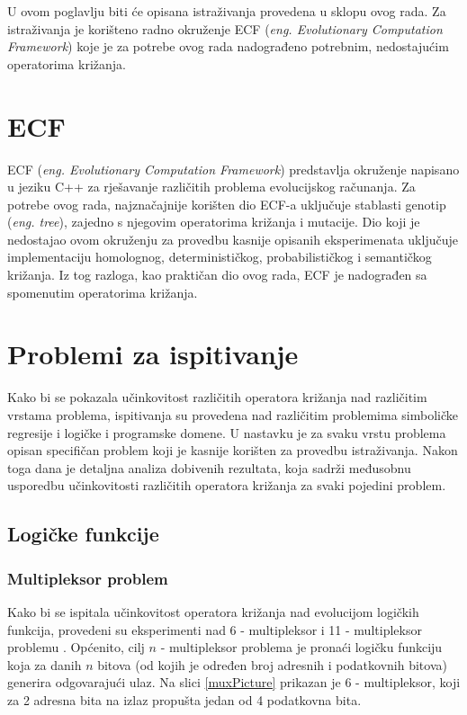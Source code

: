 U ovom poglavlju biti će opisana istraživanja provedena u sklopu ovog rada. Za istraživanja je korišteno radno okruženje ECF (\textit{eng. Evolutionary Computation Framework}) koje je za potrebe ovog rada nadograđeno potrebnim, nedostajućim  operatorima križanja.

\section{ECF}
ECF \cite{ecf} (\textit{eng. Evolutionary Computation Framework}) predstavlja okruženje napisano u jeziku C++ za rješavanje različitih problema evolucijskog računanja. Za potrebe ovog rada, najznačajnije korišten dio ECF-a uključuje stablasti genotip (\textit{eng. tree}), zajedno s njegovim operatorima križanja i mutacije. Dio koji je nedostajao ovom okruženju za provedbu kasnije opisanih eksperimenata uključuje implementaciju homolognog, determinističkog, probabilističkog i semantičkog križanja. Iz tog razloga, kao praktičan dio ovog rada, ECF je nadograđen sa spomenutim operatorima križanja.

\section{Problemi za ispitivanje}

Kako bi se pokazala učinkovitost različitih operatora križanja nad različitim vrstama problema, ispitivanja su provedena nad različitim problemima simboličke regresije i logičke i programske domene. U nastavku je za svaku vrstu problema opisan specifičan problem koji je kasnije korišten za provedbu istraživanja. Nakon toga dana je detaljna analiza dobivenih rezultata, koja sadrži međusobnu usporedbu učinkovitosti različitih operatora križanja za svaki pojedini problem.

\subsection{Logičke funkcije}

\subsubsection{Multipleksor problem}
Kako bi se ispitala učinkovitost operatora križanja nad evolucijom logičkih funkcija, provedeni su eksperimenti nad 6 - multipleksor i 11 - multipleksor problemu \cite{koza}. Općenito, cilj $n$ - multipleksor problema je pronaći logičku funkciju koja za danih $n$ bitova (od kojih je određen broj adresnih i podatkovnih bitova) generira odgovarajući ulaz. Na slici \ref{muxPicture} prikazan je 6 - multipleksor, koji za 2 adresna bita na izlaz propušta jedan od 4 podatkovna bita.

